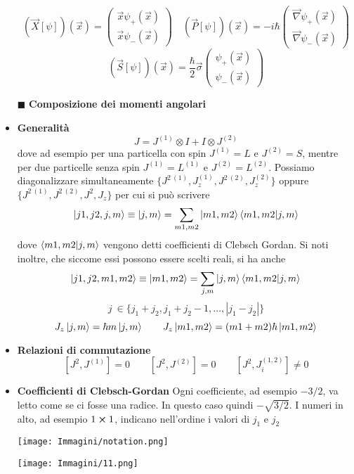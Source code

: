\documentclass{book}
\newcommand{\g}{\textbf}
\newcommand{\e}{\begin{equation}}
\newcommand{\ex}{\end{equation} }
\renewcommand{\it}{\item[$\cdot$]}
\begin{document}
\begin{multicols}{4}
\begin{itemize}
    \e{(\vec{X}\left[\psi\right])(\vec{x}) = \begin{pmatrix}
        \vec{x}\psi_{+}(\vec{x})\\
        \vec{x}\psi_{-}(\vec{x})
    \end{pmatrix} \quad (\vec{P}[\psi])(\vec{x}) = -i \hbar \begin{pmatrix}
        \vec{\nabla}\psi_{+}(\vec{x})\\
        \vec{\nabla}\psi_{-}(\vec{x})
    \end{pmatrix} }\ex
    \e{(\vec{S}[\psi])(\vec{x}) = \frac{\hbar}{2}\vec{\sigma}\begin{pmatrix}
        \psi_{+}(\vec{x})\\
        \psi_{-}(\vec{x})
    \end{pmatrix}}\ex
\item [$\blacksquare$] \g{Composizione dei momenti angolari}
    \it \g{Generalità}
        \e{J = J^{(1)} \otimes I + I \otimes J^{(2)}} \ex
        dove ad esempio per una particella con spin $J^{(1)} = L$ e $J^{(2)} = S$, mentre per due particelle senza spin $J^{(1)} = L^{(1)}$ e $J^{(2)} = L^{(2)}$. Possiamo diagonalizzare simultaneamente $\{J^{2 \ (1)}, J^{(1)}_z,J^{2 \ (2)}, J^{(2)}_z\}$ oppure $\{J^{2 \ (1)}, J^{2 \ (2)}, J^{2},J_{z}\}$ per cui si può scrivere
        \e{\ket{j1,j2,j,m} \equiv \ket{j,m} = \sum_{m1,m2}\ket{m1,m2}\braket{m1,m2}{j,m}}\ex
        dove $\braket{m1,m2}{j,m}$ vengono detti coefficienti di Clebsch Gordan. Si noti inoltre, che siccome essi possono essere scelti reali, si ha anche 
        \e{\ket{j1,j2,m1,m2} \equiv \ket{m1,m2} = \sum_{j,m} \ket{j,m}\braket{m1,m2}{j,m}}\ex 
         \e{j \ \in \{j_{1} + j_{2}, j_{1} + j_{2} - 1, \dots, |j_{1}-j_{2}|\}}\ex
        \e{J_{z}\ket{j,m} = \hbar m\ket{j,m} \qquad J_{z}\ket{m1,m2} = (m1 + m2)\hbar \ket{m1,m2}}\ex
    \it \g{Relazioni di commutazione}
        \e{[J^2, J^{(1)}] = 0 \qquad [J^2, J^{(2)}] = 0 \qquad [J^2, J^{(1,2)}_i] \neq 0} \ex
        \it \g{Coefficienti di Clebsch-Gordan} Ogni coefficiente, ad esempio $-3/2$, va letto come se ci fosse una radice. In questo caso quindi $-\sqrt{3/2}$. I numeri in alto, ad esempio $1 \cross 1$, indicano nell'ordine i valori di $j_{1}$ e $j_{2}$
         \begin{minipage}[t]{1.1\linewidth}
        \centering
        \begin{minipage}[t]{0.3\linewidth} %
            \centering
            \texttt{[image: Immagini/notation.png]}
        \end{minipage}%
        \hfill
        \begin{minipage}[t]{0.7\linewidth} %
            \centering
            \texttt{[image: Immagini/11.png]}
        \end{minipage}
    \end{minipage}
 

\end{itemize}
\end{multicols}
\end{document}
